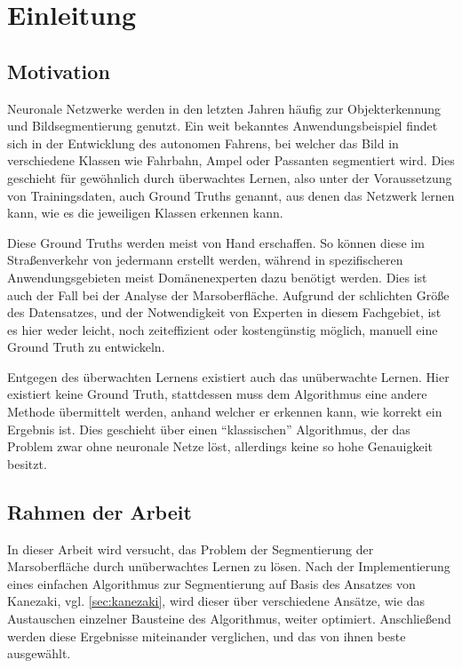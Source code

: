 \chapter{Einleitung}
\label{chap:einleitung}

\section{Motivation}
\label{sec:motivation}

Neuronale Netzwerke werden in den letzten Jahren häufig zur Objekterkennung und Bildsegmentierung genutzt. Ein weit bekanntes Anwendungsbeispiel findet sich in der Entwicklung des autonomen Fahrens, bei welcher das Bild in verschiedene Klassen wie \zB Fahrbahn, Ampel oder Passanten segmentiert wird. Dies geschieht für gewöhnlich durch überwachtes Lernen, also unter der Voraussetzung von Trainingsdaten, auch Ground Truths genannt, aus denen das Netzwerk lernen kann, wie es die jeweiligen Klassen erkennen kann.

Diese Ground Truths werden meist von Hand erschaffen. So können diese im Straßenverkehr von jedermann erstellt werden, während in spezifischeren Anwendungsgebieten meist Domänenexperten dazu benötigt werden. Dies ist auch der Fall bei der Analyse der Marsoberfläche. Aufgrund der schlichten Größe des Datensatzes, und der Notwendigkeit von Experten in diesem Fachgebiet, ist es hier weder leicht, noch zeiteffizient oder kostengünstig möglich, manuell eine Ground Truth zu entwickeln.

Entgegen des überwachten Lernens existiert auch das unüberwachte Lernen. Hier existiert keine Ground Truth, stattdessen muss dem Algorithmus eine andere Methode übermittelt werden, anhand welcher er erkennen kann, wie korrekt ein Ergebnis ist. Dies geschieht \zB über einen \enquote{klassischen} Algorithmus, der das Problem zwar ohne neuronale Netze löst, allerdings keine so hohe Genauigkeit besitzt.

\section{Rahmen der Arbeit}
\label{sec:rahmen}

In dieser Arbeit wird versucht, das Problem der Segmentierung der Marsoberfläche durch unüberwachtes Lernen zu lösen. Nach der Implementierung eines einfachen Algorithmus zur Segmentierung auf Basis des Ansatzes von Kanezaki\cite{kanezaki}, vgl. \ref{sec:kanezaki}, wird dieser über verschiedene Ansätze, wie \zB das Austauschen einzelner Bausteine des Algorithmus, weiter optimiert. Anschließend werden diese Ergebnisse miteinander verglichen, und das von ihnen beste ausgewählt.